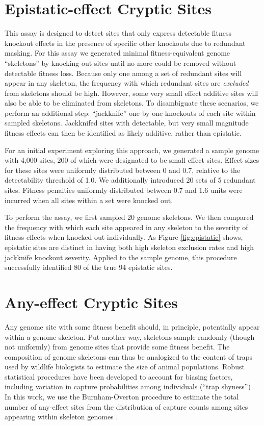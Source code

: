 \section{Epistatic-effect Cryptic Sites}



This assay is designed to detect sites that only express detectable fitness knockout effects in the presence of specific other knockouts due to redundant masking.
For this assay we generated minimal fitness-equivalent genome ``skeletons'' by knocking out sites until no more could be removed without detectable fitness loss.
Because only one among a set of redundant sites will appear in any skeleton, the frequency with which redundant sites are \textit{excluded} from skeletons should be high.
However, some very small effect additive sites will also be able to be eliminated from skeletons.
To disambiguate these scenarios, we perform an additional step: ``jackknife'' one-by-one knockouts of each site within sampled skeletons.
Jackknifed sites with detectable, but very small magnitude fitness effects can then be identified as likely additive, rather than epistatic.

For an initial experiment exploring this approach, we generated a sample genome with 4,000 sites, 200 of which were designated to be small-effect sites.
Effect sizes for these sites were uniformly distributed between 0 and 0.7, relative to the detectability threshold of 1.0.
We additionally introduced 20 sets of 5 redundant sites.
Fitness penalties uniformly distributed between 0.7 and 1.6 units were incurred when all sites within a set were knocked out.

To perform the assay, we first sampled 20 genome skeletons.
We then compared the frequency with which each site appeared in any skeleton to the severity of fitness effects when knocked out individually.
As Figure \ref{fig:epistatic} shows, epistatic sites are distinct in having both high skeleton exclusion rates and high jackknife knockout severity.
Applied to the sample genome, this procedure successfully identified 80 of the true 94 epistatic sites.

\section{Any-effect Cryptic Sites}

Any genome site with some fitness benefit should, in principle, potentially appear within a genome skeleton.
Put another way, skeletons sample randomly (though not uniformly) from genome sites that provide some fitness benefit.
The composition of genome skeletons can thus be analogized to the content of traps used by wildlife biologists to estimate the size of animal populations.
Robust statistical procedures have been developed to account for biasing factors, including variation in capture probabilities among individuals (``trap shyness'') \citep{amstrup2010handbook}.
In this work, we use the Burnham-Overton procedure to estimate the total number of any-effect sites from the distribution of capture counts among sites appearing within skeleton genomes \citep{burnham1979robust}.

